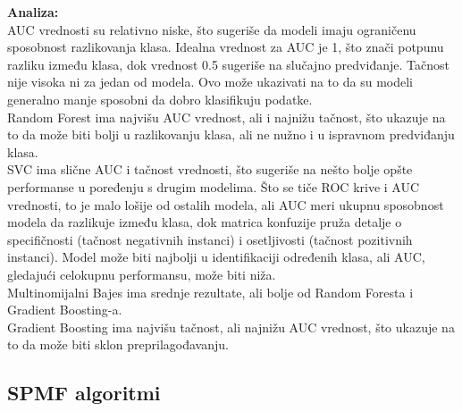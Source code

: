 \documentclass{article}
\begin{document}
\begin{flushleft}
\textbf{Analiza:}\\
\vspace{1mm}
    AUC vrednosti su relativno niske, što sugeriše da modeli imaju ograničenu sposobnost razlikovanja klasa. Idealna vrednost za AUC je 1, što znači potpunu razliku između klasa, dok vrednost 0.5 sugeriše na slučajno predviđanje. Tačnost nije visoka ni za jedan od modela. Ovo može ukazivati na to da su modeli generalno manje sposobni da dobro klasifikuju podatke.\\ \vspace{3mm}
Random Forest ima najvišu AUC vrednost, ali i najnižu tačnost, što ukazuje na to da može biti bolji u razlikovanju klasa, ali ne nužno i u ispravnom predviđanju klasa.\\
\vspace{3mm}
SVC ima slične AUC i tačnost vrednosti, što sugeriše na nešto bolje opšte performanse u poređenju s drugim modelima. Što se tiče ROC krive i AUC vrednosti, to je malo lošije od ostalih modela, ali AUC meri ukupnu sposobnost modela da razlikuje između klasa, dok matrica konfuzije pruža detalje o specifičnosti (tačnost negativnih instanci) i osetljivosti (tačnost pozitivnih instanci). Model može biti najbolji u identifikaciji određenih klasa, ali AUC, gledajući celokupnu performansu, može biti niža.\\
\vspace{3mm}
Multinomijalni Bajes ima srednje rezultate, ali bolje od Random Foresta i Gradient Boosting-a.\\
\vspace{3mm}
Gradient Boosting ima najvišu tačnost, ali najnižu AUC vrednost, što ukazuje na to da može biti sklon preprilagođavanju.\\

\end{flushleft}




\newpage



\subsection{SPMF algoritmi}
\end{document}
